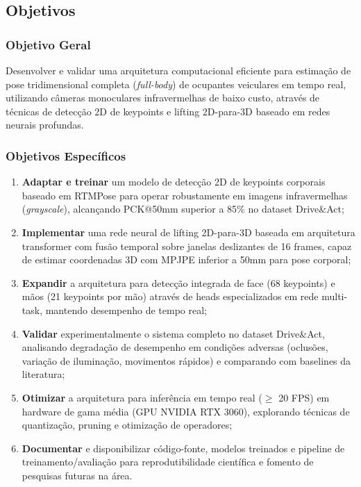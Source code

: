 \documentclass[12pt, a4paper]{article}
\begin{document}
\subsection{Objetivos}

\subsubsection{Objetivo Geral}

Desenvolver e validar uma arquitetura computacional eficiente para estimação de pose tridimensional completa (\textit{full-body}) de ocupantes veiculares em tempo real, utilizando câmeras monoculares infravermelhas de baixo custo, através de técnicas de detecção 2D de keypoints e lifting 2D-para-3D baseado em redes neurais profundas.

\subsubsection{Objetivos Específicos}

\begin{enumerate}
    \item \textbf{Adaptar e treinar} um modelo de detecção 2D de keypoints corporais baseado em RTMPose para operar robustamente em imagens infravermelhas (\textit{grayscale}), alcançando PCK@50mm superior a 85\% no dataset Drive\&Act;
    
    \item \textbf{Implementar} uma rede neural de lifting 2D-para-3D baseada em arquitetura transformer com fusão temporal sobre janelas deslizantes de 16 frames, capaz de estimar coordenadas 3D com MPJPE inferior a 50mm para pose corporal;
    
    \item \textbf{Expandir} a arquitetura para detecção integrada de face (68 keypoints) e mãos (21 keypoints por mão) através de heads especializados em rede multi-task, mantendo desempenho de tempo real;
    
    \item \textbf{Validar} experimentalmente o sistema completo no dataset Drive\&Act, analisando degradação de desempenho em condições adversas (oclusões, variação de iluminação, movimentos rápidos) e comparando com baselines da literatura;
    
    \item \textbf{Otimizar} a arquitetura para inferência em tempo real ($\geq$ 20 FPS) em hardware de gama média (GPU NVIDIA RTX 3060), explorando técnicas de quantização, pruning e otimização de operadores;
    
    \item \textbf{Documentar} e disponibilizar código-fonte, modelos treinados e pipeline de treinamento/avaliação para reprodutibilidade científica e fomento de pesquisas futuras na área.
\end{enumerate}
\end{document}
